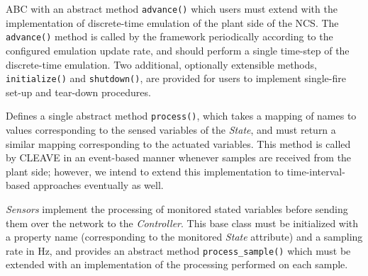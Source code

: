 \begin{description}[style=nextline]
    \item[State Base Class]
    
    \ac{ABC} with an abstract method
    \texttt{advance()} which users must extend with the implementation of discrete-time emulation of the plant side of the \ac{NCS}.
    The \texttt{advance()} method is called by the framework periodically according to the configured emulation update rate, and should perform a single time-step of the discrete-time emulation.
    Two additional, optionally extensible methods, \texttt{initialize()} and \texttt{shutdown()}, are provided for users to implement single-fire set-up and tear-down procedures.


    \item[Controller Base Class]
    
    Defines a single abstract method \texttt{process()}, which takes a mapping of names to values corresponding to the sensed variables of the \emph{State}, and must return a similar mapping corresponding to the actuated variables.
    This method is called by \ac{CLEAVE} in an event-based manner whenever samples are received from the plant side; however, we intend to extend this implementation to time-interval-based approaches eventually as well.

    \item[Sensor Base Class]
    
    \emph{Sensors} implement the processing of monitored stated variables before sending them over the network to the \emph{Controller}.
    This base class must be initialized with a property name (corresponding to the monitored \emph{State} attribute) and a sampling rate in \si{\hertz}, and provides an abstract method \texttt{process_sample()} which must be extended with an implementation of the processing performed on each sample.

    \item[Actuator Base Class] 
    

\end{description}
